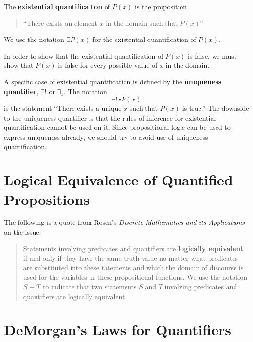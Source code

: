 \begin{defn}
  The \textbf{existential quantificaiton} of $P(x)$ is the proposition
  \begin{quote}
    ``There exists an element $x$ in the domain such that $P(x)$''
  \end{quote}
  We use the notation $\exists P(x)$ for the existential quantification of
  $P(x)$.%
\end{defn}

In order to show that the existential quantification of $P(x)$ is false, we must
show that $P(x)$ is false for every possible value of $x$ in the domain.

A specific case of existential quantification is defined by the
\textbf{uniqueness quantifier}, $\exists!$ or $\exists_1$. The notation
\[ \exists! x P(x) \]
is the statement ``There exists a unique $x$ such that $P(x)$ is true.'' The
downside to the uniqueness quantifier is that the rules of inference for
existential quantification cannot be used on it. Since propositional logic can
be used to express uniqueness already, we should try to avoid use of uniqueness
quantification.

\section{Logical Equivalence of Quantified Propositions}

The following is a quote from Rosen's \emph{Discrete Mathematics and its Applications} on the issue:

\begin{quote}
  Statements involving predicates and quantifiers are \textbf{logically
  equivalent} if and only if they have the same truth value no matter what
  predicates are substituted into these tatements and which the domain of
  discourse is used for the variables in these propositional functions. We use the
  notation $S \equiv T$ to indicate that two statements $S$ and $T$ involving
  predicates and quantifiers are logically equivalent.

  \hfill\cite[p.~45]{rosen}
\end{quote}

\section{DeMorgan's Laws for Quantifiers}


